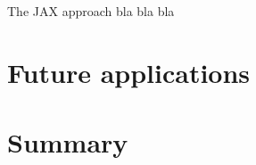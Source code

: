 The JAX approach bla bla bla

\begin{figure}
    \centering
    \label{fig:JAX_Layer2_Taus}
\end{figure}

\section{Future applications} %

\section*{Summary} %